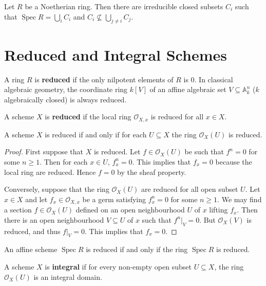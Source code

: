 \documentclass[12pt]{book}
\newcommand{\inlinedef}[1]{\textcolor{oxfordblue}{\bfseries #1}}
\theoremstyle{definition}
\newcommand{\AAA}{\mathbb A}
\DeclareMathOperator{\Spec}{Spec}
\begin{document}
	\begin{proposition}
		Let $R$ be a Noetherian ring. Then there are irreducible closed subsets $C_i$ such that $\Spec R = \bigcup_i C_i$ and $C_i \not\subseteq \bigcup_{j \neq i} C_j$.
	\end{proposition}
	
	\section{Reduced and Integral Schemes}
	
	A ring $R$ is \inlinedef{reduced} if the only nilpotent elements of $R$ is 0. In classical algebraic geometry, the coordinate ring $k[V]$ of an affine algebraic set $V \subseteq \AAA^n_k$ ($k$ algebraically closed) is always reduced. 
	
	\begin{definition}
		A scheme $X$ is \inlinedef{reduced} if the local ring $\mathcal{O}_{X, x}$ is reduced for all $x \in X$.
	\end{definition}
	
	\begin{proposition}\label{chap5:reduced-iff-all-ring-are-reduced}
		A scheme $X$ is reduced if and only if for each $U \subseteq X$ the ring $\mathcal{O}_X(U)$ is reduced.
	\end{proposition}
	\begin{proof}
		First suppose that $X$ is reduced. Let $f \in \mathcal{O}_X(U)$ be such that $f^n = 0$ for some $n \geq 1$. Then for each $x \in U$, $f_x^n = 0$. This implies that $f_x = 0$ because the local ring are reduced. Hence $f = 0$ by the sheaf property.
		
		Conversely, suppose that the ring $\mathcal{O}_X(U)$ are reduced for all open subset $U$. Let $x \in X$ and let $f_x \in \mathcal{O}_{X, x}$ be a germ satisfying $f_x^n = 0$ for some $n \geq 1$. We may find a section $f \in\mathcal{O}_X(U)$ defined on an open neighbourhood $U$ of $x$ lifting $f_x$. Then there is an open neighbourhood $V \subseteq U$ of $x$ such that $f^n|_{V} = 0$. But $\mathcal{O}_X(V)$ is reduced, and thus $f|_{V} = 0$. This implies that $f_x = 0$.
	\end{proof}
	
	\begin{corollary}
		An affine scheme $\Spec R$ is reduced if and only if the ring $\Spec R$ is reduced.
	\end{corollary}
	
	\begin{definition}
		A scheme $X$ is \inlinedef{integral} if for every non-empty open subset $U\subseteq X$, the ring $\mathcal{O}_X(U)$ is an integral domain.
	\end{definition}
	
\end{document}

